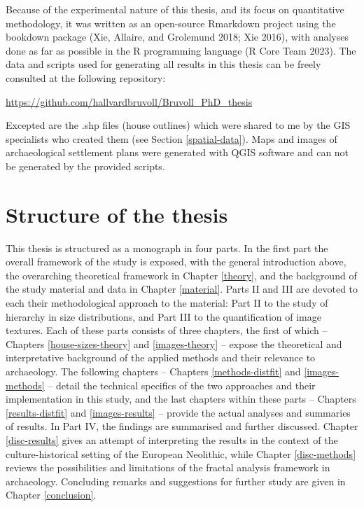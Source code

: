 \documentclass[
  12pt,
  a4paper, twoside]{book}
\begin{document}
Because of the experimental nature of this thesis, and its focus on quantitative methodology, it was written as an open-source Rmarkdown project using the bookdown package (Xie, Allaire, and Grolemund 2018; Xie 2016), with analyses done as far as possible in the R programming language (R Core Team 2023). The data and scripts used for generating all results in this thesis can be freely consulted at the following repository:

\url{https://github.com/hallvardbruvoll/Bruvoll_PhD_thesis}

Excepted are the .shp files (house outlines) which were shared to me by the GIS specialists who created them (see Section \ref{spatial-data}). Maps and images of archaeological settlement plans were generated with QGIS software and can not be generated by the provided scripts.

\hypertarget{structure-of-the-thesis}{%
\section{Structure of the thesis}\label{structure-of-the-thesis}}

This thesis is structured as a monograph in four parts. In the first part the overall framework of the study is exposed, with the general introduction above, the overarching theoretical framework in Chapter \ref{theory}, and the background of the study material and data in Chapter \ref{material}. Parts II and III are devoted to each their methodological approach to the material: Part II to the study of hierarchy in size distributions, and Part III to the quantification of image textures. Each of these parts consists of three chapters, the first of which -- Chapters \ref{house-sizes-theory} and \ref{images-theory} -- expose the theoretical and interpretative background of the applied methods and their relevance to archaeology. The following chapters -- Chapters \ref{methods-distfit} and \ref{images-methods} -- detail the technical specifics of the two approaches and their implementation in this study, and the last chapters within these parts -- Chapters \ref{results-distfit} and \ref{images-results} -- provide the actual analyses and summaries of results. In Part IV, the findings are summarised and further discussed. Chapter \ref{disc-results} gives an attempt of interpreting the results in the context of the culture-historical setting of the European Neolithic, while Chapter \ref{disc-methods} reviews the possibilities and limitations of the fractal analysis framework in archaeology. Concluding remarks and suggestions for further study are given in Chapter \ref{conclusion}.
\end{document}
